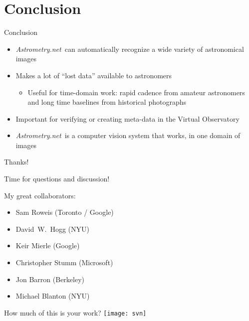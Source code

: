 \documentclass[compress]{beamer}
\newcommand{\an}{\emph{Astrometry.net}\xspace}
\begin{document}
\section{Conclusion}

\begin{frame}[label=conclusion]{Conclusion}
  \begin{itemize}
    \addtolength{\itemsep}{0.5ex}
  \item \an\  can automatically recognize a wide variety of astronomical images
  \item Makes a lot of ``\alert{lost data}'' available to astronomers
    \begin{itemize}
    \item Useful for \alert{time-domain} work: rapid cadence from
      amateur astronomers and long time baselines from historical
      photographs
    \end{itemize}
  \item Important for \alert{verifying} or \alert{creating} meta-data
    in the Virtual Observatory
  \item \an\ is a computer vision system that \alert{works}, in one domain of images
  \end{itemize}
\end{frame}

\begin{frame}{Thanks!}

\alert{Time for questions and discussion!}

\vspace{1em}
My great collaborators:
\begin{itemize}
  \item Sam Roweis (Toronto / Google)
  \item David~W.~Hogg (NYU)
  \item Keir Mierle (Google)
  \item Christopher Stumm (Microsoft)
  \item Jon Barron (Berkeley)
  \item Michael Blanton (NYU)
\end{itemize}
\end{frame}


\begin{frame}{How much of this is your work?}
  \texttt{[image: svn]}
\end{frame}
\end{document}
